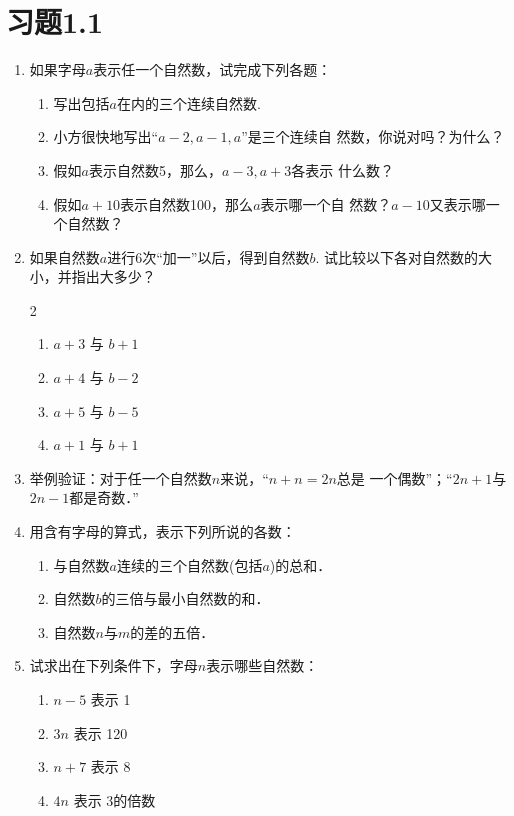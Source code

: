 \section*{习题1.1}

\begin{enumerate}
	\item 如果字母$a$表示任一个自然数，试完成下列各题：
	\begin{enumerate}
		\item 写出包括$a$在内的三个连续自然数.
		\item 小方很快地写出“$a-2, a-1, a$”是三个连续自
		然数，你说对吗？为什么？
		\item 假如$a$表示自然数5，那么，$a-3,a+3$各表示
		什么数？
		\item 假如$a+10$表示自然数100，那么$a$表示哪一个自
		然数？$a-10$又表示哪一个自然数？
		
	\end{enumerate}
	
	\item  如果自然数$a$进行6次“加一”以后，得到自然数$b$.
	试比较以下各对自然数的大小，并指出大多少？
	\begin{multicols}{2}
		\begin{enumerate}
			\item $a+3$ 与 $b+1$
			\item $a+4$ 与 $b-2$
			\item $a+5$ 与 $b-5$
			\item $a+1$ 与 $b+1$
		\end{enumerate}
	\end{multicols}
	
	\item  举例验证：对于任一个自然数$n$来说，“$n+n=2n$总是
	一个偶数”；“$2n + 1$与$2n-1$都是奇数．”
	
	\item 用含有字母的算式，表示下列所说的各数：
	\begin{enumerate}
		\item 与自然数$a$连续的三个自然数(包括$a$)的总和．
		\item 自然数$b$的三倍与最小自然数的和．
		\item 自然数$n$与$m$的差的五倍．
	\end{enumerate}
	
	\item 试求出在下列条件下，字母$n$表示哪些自然数：
	\begin{enumerate}
		\item $n-5$ 表示 1
		\item  $3n$ 表示 120
		\item  $n+7$ 表示 8
		\item  $4n$ 表示 3的倍数
	\end{enumerate}
	

\end{enumerate}
